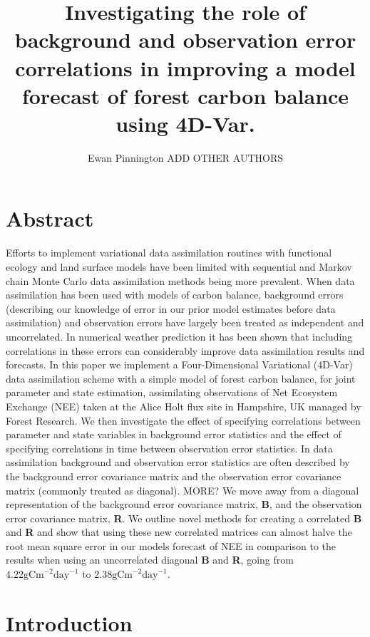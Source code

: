\documentclass[11pt]{article}
\title{Investigating the role of background and observation error correlations in improving a model forecast of forest carbon balance using 4D-Var.}
\author{Ewan Pinnington ADD OTHER AUTHORS}
\begin{document}
\maketitle

\section*{Abstract}

Efforts to implement variational data assimilation routines with functional ecology and land surface models have been limited with sequential and Markov chain Monte Carlo data assimilation methods being more prevalent. When data assimilation has been used with models of carbon balance, background errors (describing our knowledge of error in our prior model estimates before data assimilation) and observation errors have largely been treated as independent and uncorrelated. In numerical weather prediction it has been shown that including correlations in these errors can considerably improve data assimilation results and forecasts. In this paper we implement a Four-Dimensional Variational (4D-Var) data assimilation scheme with a simple model of forest carbon balance, for joint parameter and state estimation, assimilating observations of Net Ecosystem Exchange (NEE) taken at the Alice Holt flux site in Hampshire, UK managed by Forest Research. We then investigate the effect of specifying correlations between parameter and state variables in background error statistics and the effect of specifying correlations in time between observation error statistics. In data assimilation background and observation error statistics are often described by the background error covariance matrix and the observation error covariance matrix (commonly treated as diagonal). MORE? We move away from a diagonal representation of the background error covariance matrix, \textbf{B}, and the observation error covariance matrix, \textbf{R}. We outline novel methods for creating a correlated \textbf{B} and \textbf{R} and show that using these new correlated matrices can almost halve the root mean square error in our models forecast of NEE in comparison to the results when using an uncorrelated diagonal \textbf{B} and \textbf{R}, going from $4.22\text{gCm}^{-2}\text{day}^{-1}$ to $2.38\text{gCm}^{-2}\text{day}^{-1}$.      

\section{Introduction} \label{sec:intro}
\end{document}
